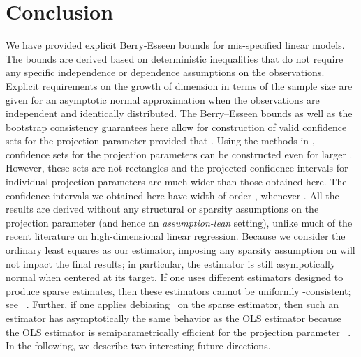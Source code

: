 \documentclass{article}
\begin{document}
\section{Conclusion}
\label{section::conclusion}
We have provided explicit Berry-Esseen bounds
for mis-specified linear models. The bounds are
derived based on deterministic inequalities that do not
require any specific independence or dependence assumptions
on the observations.
Explicit requirements on the growth of dimension  
in terms of the sample size   are given for an asymptotic
normal approximation when the observations are independent
and identically distributed.
The Berry--Esseen bounds as well as the bootstrap consistency guarantees here allow for construction of valid confidence sets
for the projection parameter provided that  .
Using the methods in
\cite{kuchibhotla2018valid}, confidence sets for the projection parameters can be constructed even for larger   .
However, these sets are not rectangles and the projected
confidence intervals for individual projection parameters
are much wider than those obtained here. The confidence
intervals we obtained here have width of order  ,
whenever  .
All the results are derived without any structural or sparsity assumptions on the projection parameter   (and hence an \emph{assumption-lean} setting), unlike much of the recent literature on high-dimensional linear regression. Because we consider the ordinary least squares as our estimator, imposing any sparsity assumption on   will not impact the final results; in particular, the estimator is still asympotically normal when centered at its target. If one uses different estimators designed to produce sparse estimates, then these estimators cannot be uniformly  -consistent; see ~\cite{potscher2009confidence}. Further, if one applies debiasing~\citep{javanmard2014confidence,vandegeer2014asymptotically,zhang2014confidence} on the sparse estimator, then such an estimator has asymptotically the same behavior as the OLS estimator because the OLS estimator is semiparametrically efficient for the projection parameter  ~\cite{Levit76}.
In the following, we describe two interesting future directions.
\end{document}
